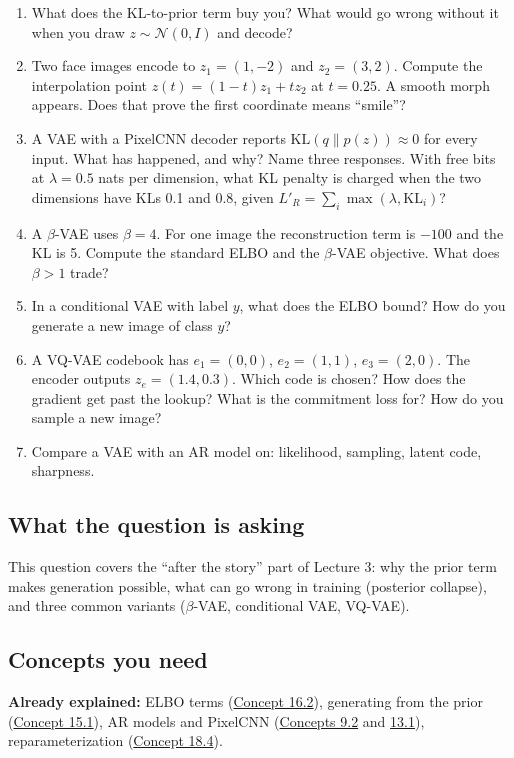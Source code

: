\documentclass[12pt,a4paper]{article}
\begin{document}
\begin{enumerate}[label=(\alph*)]
  \item What does the KL-to-prior term buy you? What would go wrong without it when you draw $z\sim\mathcal{N}(0,I)$ and decode?
  \item Two face images encode to $z_1=(1,-2)$ and $z_2=(3,2)$. Compute the interpolation point $z(t)=(1-t)z_1+tz_2$ at $t=0.25$. A smooth morph appears. Does that prove the first coordinate means ``smile''?
  \item A VAE with a PixelCNN decoder reports $\mathrm{KL}(q\|p(z))\approx0$ for every input. What has happened, and why? Name three responses. With free bits at $\lambda=0.5$ nats per dimension, what KL penalty is charged when the two dimensions have KLs 0.1 and 0.8, given $L'_R=\sum_i\max(\lambda,\mathrm{KL}_i)$?
  \item A $\beta$-VAE uses $\beta=4$. For one image the reconstruction term is $-100$ and the KL is 5. Compute the standard ELBO and the $\beta$-VAE objective. What does $\beta>1$ trade?
  \item In a conditional VAE with label $y$, what does the ELBO bound? How do you generate a new image of class $y$?
  \item A VQ-VAE codebook has $e_1=(0,0)$, $e_2=(1,1)$, $e_3=(2,0)$. The encoder outputs $z_e=(1.4,0.3)$. Which code is chosen? How does the gradient get past the lookup? What is the commitment loss for? How do you sample a new image?
  \item Compare a VAE with an AR model on: likelihood, sampling, latent code, sharpness.
\end{enumerate}

\subsection{What the question is asking}

This question covers the ``after the story'' part of Lecture 3: why the prior term makes generation possible, what can go wrong in training (posterior collapse), and three common variants ($\beta$-VAE, conditional VAE, VQ-VAE).

\subsection{Concepts you need}

\textbf{Already explained:} ELBO terms (\hyperref[c16-2]{Concept 16.2}), generating from the prior (\hyperref[c15-1]{Concept 15.1}), AR models and PixelCNN (\hyperref[c9-2]{Concepts 9.2} and \hyperref[c13-1]{13.1}), reparameterization (\hyperref[c18-4]{Concept 18.4}).
\end{document}
